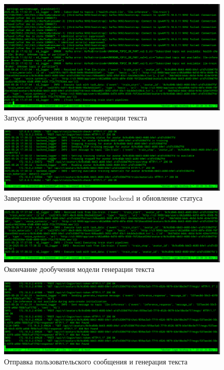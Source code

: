 \begin{figure}
    \centering
    \includegraphics[width=1.0\linewidth]{images/results/llm-start-train.png}
    \caption{Запуск дообучения в модуле генерации текста}
    \label{fig:res-llm-start-train}
\end{figure}

\begin{figure}
    \centering
    \includegraphics[width=1.0\linewidth]{images/results/bk-stop-train.png}
    \caption{Завершение обучения на стороне backend и обновление статуса}
    \label{fig:res-bk-stop-train}
\end{figure}

\begin{figure}
    \centering
    \includegraphics[width=1.0\linewidth]{images/results/llm-stop-train.png}
    \caption{Окончание дообучения модели генерации текста}
    \label{fig:res-llm-stop-train}
\end{figure}

\begin{figure}
    \centering
    \includegraphics[width=1.0\linewidth]{images/results/bk-start-gen-llm.png}
    \caption{Отправка пользовательского сообщения и генерация текста}
    \label{fig:res-bk-start-gen-llm}
\end{figure}

